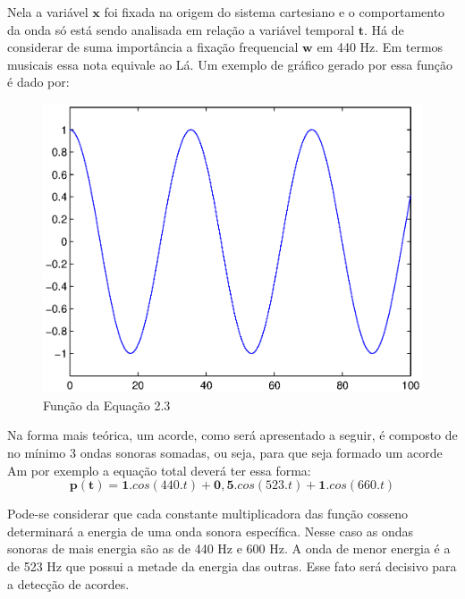 \newpage
Nela a variável $\textbf{x}$ foi fixada na origem do sistema cartesiano e o comportamento da onda só está sendo analisada em relação a variável temporal $\textbf{t}$. Há de considerar de suma importância a fixação frequencial $\textbf{w}$ em 440 Hz. Em termos musicais essa nota equivale ao Lá. Um exemplo de gráfico gerado por essa função é dado por:
\begin{figure}[h]
	\centering
		\includegraphics[scale=0.7]{figuras/cos440.eps}
	\caption{Função da Equação 2.3}
\end{figure}

Na forma mais teórica, um acorde, como será apresentado a seguir, é composto de no mínimo 3 ondas sonoras somadas, ou seja, para que seja formado um acorde Am por exemplo a equação total deverá ter essa forma: 
\begin{equation}
\label{eqn04}
	\mathbf{p(t)} = \mathbf{1}.{cos}(440.t) + \mathbf{0,5}.{cos}(523.t) + \mathbf{1}.{cos}(660.t)
\end{equation}

Pode-se considerar que cada constante multiplicadora das função cosseno determinará a energia de uma onda sonora específica. Nesse caso as ondas sonoras de mais energia são as de 440 Hz e 600 Hz. A onda de menor energia é a de 523 Hz que possui a metade da energia das outras. Esse fato será decisivo para a detecção de acordes. 

